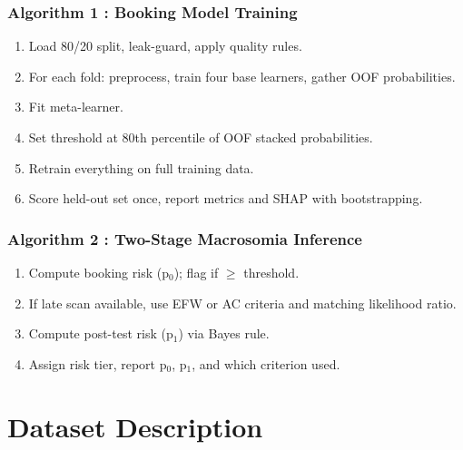\documentclass[conference]{IEEEtran}
\begin{document}
\subsubsection*{Algorithm 1 : Booking Model Training}

\begin{enumerate}

\item Load 80/20 split, leak-guard, apply quality rules.

\item For each fold: preprocess, train four base learners, gather OOF probabilities.

\item Fit meta-learner.

\item Set threshold at 80th percentile of OOF stacked probabilities.

\item Retrain everything on full training data.

\item Score held-out set once, report metrics and SHAP with bootstrapping.

\end{enumerate}

\subsubsection*{Algorithm 2 : Two-Stage Macrosomia Inference}

\begin{enumerate}

\item Compute booking risk (p$_{0}$); flag if \ensuremath{\geq} threshold.

\item If late scan available, use EFW or AC criteria and matching likelihood ratio.

\item Compute post-test risk (p$_{1}$) via Bayes rule.

\item Assign risk tier, report p$_{0}$, p$_{1}$, and which criterion used.

\end{enumerate}

\section{Dataset Description}
\end{document}
